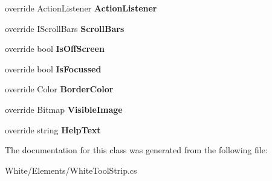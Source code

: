 \begin{DoxyCompactItemize}
\item 
\hypertarget{class_proto_test_1_1_golem_1_1_white_1_1_elements_1_1_white_tool_strip_ac609c8085b378a1cbbc60cce4b3029bd}{override Action\-Listener {\bfseries Action\-Listener}}\label{class_proto_test_1_1_golem_1_1_white_1_1_elements_1_1_white_tool_strip_ac609c8085b378a1cbbc60cce4b3029bd}

\item 
\hypertarget{class_proto_test_1_1_golem_1_1_white_1_1_elements_1_1_white_tool_strip_a5f18e445c8f27e301461cd85bc39fbc0}{override I\-Scroll\-Bars {\bfseries Scroll\-Bars}}\label{class_proto_test_1_1_golem_1_1_white_1_1_elements_1_1_white_tool_strip_a5f18e445c8f27e301461cd85bc39fbc0}

\item 
\hypertarget{class_proto_test_1_1_golem_1_1_white_1_1_elements_1_1_white_tool_strip_aab25bce400d374ac75fd74c7712aaf7b}{override bool {\bfseries Is\-Off\-Screen}}\label{class_proto_test_1_1_golem_1_1_white_1_1_elements_1_1_white_tool_strip_aab25bce400d374ac75fd74c7712aaf7b}

\item 
\hypertarget{class_proto_test_1_1_golem_1_1_white_1_1_elements_1_1_white_tool_strip_adc6cd8ddc09dc7e6393e1be0877d9ee3}{override bool {\bfseries Is\-Focussed}}\label{class_proto_test_1_1_golem_1_1_white_1_1_elements_1_1_white_tool_strip_adc6cd8ddc09dc7e6393e1be0877d9ee3}

\item 
\hypertarget{class_proto_test_1_1_golem_1_1_white_1_1_elements_1_1_white_tool_strip_ad34ccf8fbce623b2cc70330af240668a}{override Color {\bfseries Border\-Color}}\label{class_proto_test_1_1_golem_1_1_white_1_1_elements_1_1_white_tool_strip_ad34ccf8fbce623b2cc70330af240668a}

\item 
\hypertarget{class_proto_test_1_1_golem_1_1_white_1_1_elements_1_1_white_tool_strip_a7812ded538652558a02c7ec565fe9569}{override Bitmap {\bfseries Visible\-Image}}\label{class_proto_test_1_1_golem_1_1_white_1_1_elements_1_1_white_tool_strip_a7812ded538652558a02c7ec565fe9569}

\item 
\hypertarget{class_proto_test_1_1_golem_1_1_white_1_1_elements_1_1_white_tool_strip_a293da0686726375c3bb3af7c7dbbdf52}{override string {\bfseries Help\-Text}}\label{class_proto_test_1_1_golem_1_1_white_1_1_elements_1_1_white_tool_strip_a293da0686726375c3bb3af7c7dbbdf52}

\end{DoxyCompactItemize}


The documentation for this class was generated from the following file\-:\begin{DoxyCompactItemize}
\item 
White/\-Elements/White\-Tool\-Strip.\-cs\end{DoxyCompactItemize}
